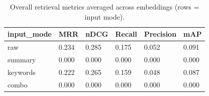 \begin{table}
\caption{Overall retrieval metrics averaged across embeddings (rows = input mode).}
\label{tab:overview-by-input-mode}
\begin{tabular}{llllll}
\toprule
input_mode & MRR & nDCG & Recall & Precision & mAP \\
\midrule
raw & 0.234 & 0.285 & 0.175 & 0.052 & 0.091 \\
summary & 0.000 & 0.000 & 0.000 & 0.000 & 0.000 \\
keywords & 0.222 & 0.265 & 0.159 & 0.048 & 0.087 \\
combo & 0.000 & 0.000 & 0.000 & 0.000 & 0.000 \\
\bottomrule
\end{tabular}
\end{table}
